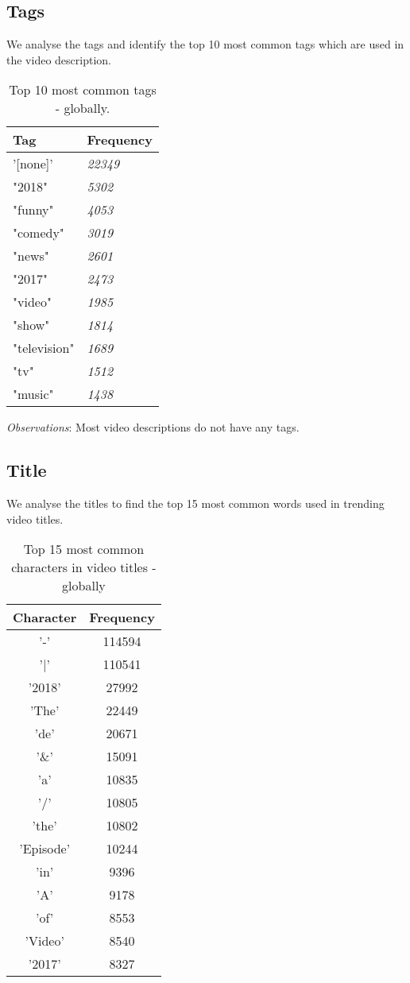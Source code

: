 \documentclass[runningheads]{llncs}
\begin{document}
\subsection{Tags}
We analyse the tags and identify the top 10 most common tags which are used in the video description.

\begin{table}
\centering
\begin{tabular}{|l|l|}
\hline
Tag &  Frequency\\
\hline
'[none]' & {\itshape 22349} \\
\hline
"2018" & {\itshape 5302} \\
\hline
"funny" & {\itshape 4053} \\
\hline
"comedy" & {\itshape 3019} \\
\hline
"news" & {\itshape 2601} \\
\hline
"2017" & {\itshape 2473} \\
\hline
"video" & {\itshape 1985} \\
\hline
"show" & {\itshape 1814} \\
\hline
"television" & {\itshape 1689} \\
\hline
"tv" & {\itshape 1512} \\
\hline
"music" & {\itshape 1438} \\
\hline
\end{tabular}
\caption{Top 10 most common tags - globally.}\label{tab1}
\end{table}
\textit{Observations}:
Most video descriptions do not have any tags.
\subsection{Title}
We analyse the titles to find the top 15 most common words used in trending video titles.
\begin{table}
\centering
\begin{tabular}{|c|c|} 
\hline 
Character & Frequency\\
\hline
 '-' & 114594\\
\hline
'|' & 110541 \\
\hline
'2018'& 27992\\
 \hline
'The' & 22449\\
\hline
'de'& 20671\\
\hline
'\&' & 15091\\
\hline
'a' & 10835\\
\hline
'/' & 10805\\
\hline
'the'& 10802\\
\hline
'Episode' & 10244\\
\hline
'in' & 9396\\
\hline
'A' & 9178\\
\hline
'of' & 8553\\
\hline
'Video' & 8540\\
\hline
'2017' & 8327\\
\hline
 \hline
\end{tabular}
\caption{Top 15 most common characters in video titles - globally}
\end{table}
\end{document}
